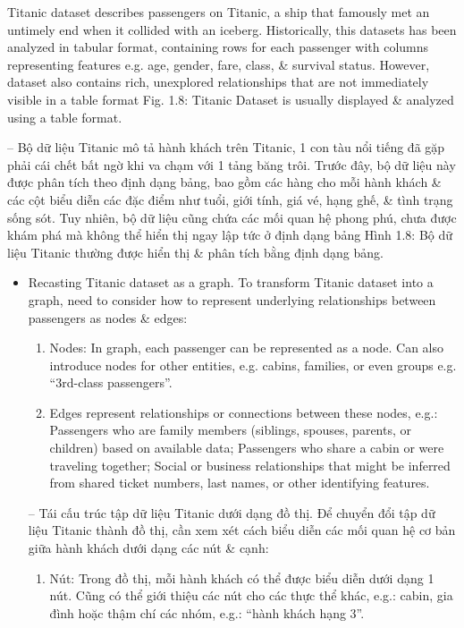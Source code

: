 \documentclass{article}
\begin{document}
\begin{itemize}
\begin{itemize}
\begin{itemize}
            Titanic dataset describes passengers on Titanic, a ship that famously met an untimely end when it collided with an iceberg. Historically, this datasets has been analyzed in tabular format, containing rows for each passenger with columns representing features e.g. age, gender, fare, class, \& survival status. However, dataset also contains rich, unexplored relationships that are not immediately visible in a table format {\sf Fig. 1.8: Titanic Dataset is usually displayed \& analyzed using a table format.}

            -- Bộ dữ liệu Titanic mô tả hành khách trên Titanic, 1 con tàu nổi tiếng đã gặp phải cái chết bất ngờ khi va chạm với 1 tảng băng trôi. Trước đây, bộ dữ liệu này được phân tích theo định dạng bảng, bao gồm các hàng cho mỗi hành khách \& các cột biểu diễn các đặc điểm như tuổi, giới tính, giá vé, hạng ghế, \& tình trạng sống sót. Tuy nhiên, bộ dữ liệu cũng chứa các mối quan hệ phong phú, chưa được khám phá mà không thể hiển thị ngay lập tức ở định dạng bảng {\sf Hình 1.8: Bộ dữ liệu Titanic thường được hiển thị \& phân tích bằng định dạng bảng.}
            \begin{itemize}
                \item {\sf Recasting Titanic dataset as a graph.} To transform Titanic dataset into a graph, need to consider how to represent underlying relationships between passengers as nodes \& edges:
                \begin{enumerate}
                    \item Nodes: In graph, each passenger can be represented as a node. Can also introduce nodes for other entities, e.g. cabins, families, or even groups e.g. ``3rd-class passengers''.
                    \item Edges represent relationships or connections between these nodes, e.g.: Passengers who are family members (siblings, spouses, parents, or children) based on available data; Passengers who share a cabin or were traveling together; Social or business relationships that might be inferred from shared ticket numbers, last names, or other identifying features.
                \end{enumerate}
                -- {\sf Tái cấu trúc tập dữ liệu Titanic dưới dạng đồ thị.} Để chuyển đổi tập dữ liệu Titanic thành đồ thị, cần xem xét cách biểu diễn các mối quan hệ cơ bản giữa hành khách dưới dạng các nút \& cạnh:
                \begin{enumerate}
                    \item Nút: Trong đồ thị, mỗi hành khách có thể được biểu diễn dưới dạng 1 nút. Cũng có thể giới thiệu các nút cho các thực thể khác, e.g.: cabin, gia đình hoặc thậm chí các nhóm, e.g.: ``hành khách hạng 3''.

\end{enumerate}
\end{itemize}
\end{itemize}
\end{itemize}
\end{itemize}
\end{document}
